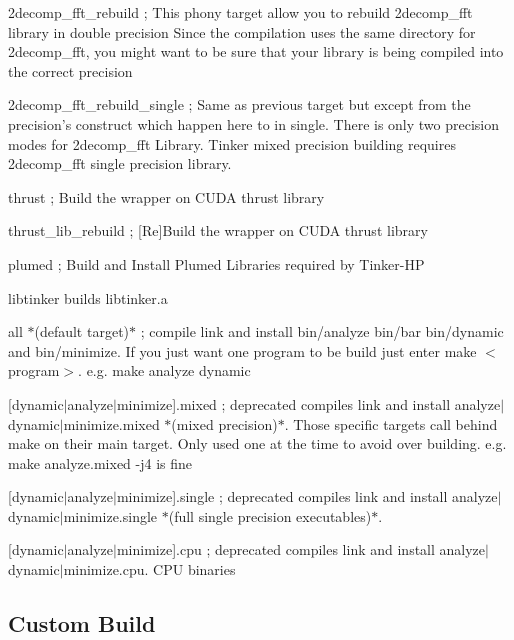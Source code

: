 \begin{DoxyItemize}
\item {\ttfamily 2decomp\-\_\-fft\-\_\-rebuild} ; This phony target allow you to rebuild 2decomp\-\_\-fft library in double precision Since the compilation uses the same directory for 2decomp\-\_\-fft, you might want to be sure that your library is being compiled into the correct precision
\item {\ttfamily 2decomp\-\_\-fft\-\_\-rebuild\-\_\-single} ; Same as previous target but except from the precision's construct which happen here to in single. There is only two precision modes for 2decomp\-\_\-fft Library. Tinker mixed precision building requires 2decomp\-\_\-fft single precision library.
\item {\ttfamily thrust} ; Build the wrapper on C\-U\-D\-A thrust library
\item {\ttfamily thrust\-\_\-lib\-\_\-rebuild} ; \mbox{[}Re\mbox{]}Build the wrapper on C\-U\-D\-A thrust library
\item {\ttfamily plumed} ; Build and Install Plumed Libraries required by Tinker-\/\-H\-P
\item {\ttfamily libtinker} builds {\ttfamily libtinker.\-a}
\item {\ttfamily all} $\ast$(default target)$\ast$ ; compile link and install {\ttfamily bin/analyze} {\ttfamily bin/bar} {\ttfamily bin/dynamic} and {\ttfamily bin/minimize}. If you just want one program to be build just enter {\ttfamily make $<$program$>$}. e.\-g. {\ttfamily make analyze dynamic}
\item {\ttfamily \mbox{[}dynamic$|$analyze$|$minimize\mbox{]}.mixed} ; deprecated compiles link and install analyze$|$dynamic$|$minimize.mixed $\ast$(mixed precision)$\ast$. Those specific targets call behind {\ttfamily make} on their main target. Only used one at the time to avoid over building. e.\-g. {\ttfamily make analyze.\-mixed -\/j4} is fine
\item {\ttfamily \mbox{[}dynamic$|$analyze$|$minimize\mbox{]}.single} ; deprecated compiles link and install analyze$|$dynamic$|$minimize.single $\ast$(full single precision executables)$\ast$.
\item {\ttfamily \mbox{[}dynamic$|$analyze$|$minimize\mbox{]}.cpu} ; deprecated compiles link and install analyze$|$dynamic$|$minimize.cpu. C\-P\-U binaries
\end{DoxyItemize}

\subsection*{Custom Build}

